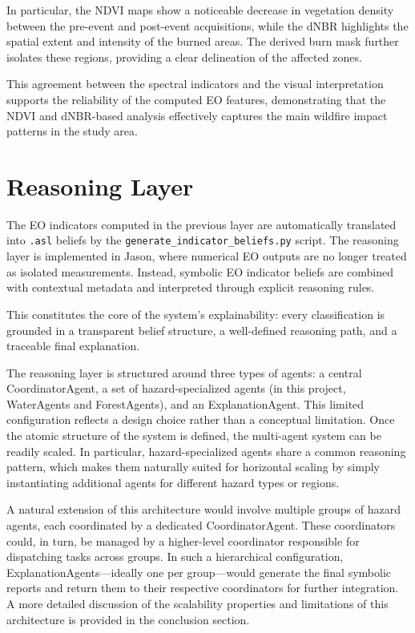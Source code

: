 \documentclass[12pt]{article}
\let\oldtexttt\texttt
\renewcommand{\texttt}[1]{{\fontsize{10.5}{12}\selectfont\oldtexttt{#1}}}
\begin{document}
In particular, the NDVI maps show a noticeable decrease in vegetation density between the pre-event and post-event acquisitions, while the dNBR highlights the spatial extent and intensity of the burned areas. The derived burn mask further isolates these regions, providing a clear delineation of the affected zones.

This agreement between the spectral indicators and the visual interpretation supports the reliability of the computed EO features, demonstrating that the NDVI and dNBR-based analysis effectively captures the main wildfire impact patterns in the study area.
\section{Reasoning Layer}

The EO indicators computed in the previous layer are automatically translated into \texttt{.asl} beliefs by the \texttt{generate\_indicator\_beliefs.py} script. The reasoning layer is implemented in Jason, where numerical EO outputs are no longer treated as isolated measurements. Instead, symbolic EO indicator beliefs are combined with contextual metadata and interpreted through explicit reasoning rules.

This constitutes the core of the system’s explainability: every classification is grounded in a transparent belief structure, a well-defined reasoning path, and a traceable final explanation.

The reasoning layer is structured around three types of agents: a central CoordinatorAgent, a set of hazard-specialized agents (in this project, WaterAgents and ForestAgents), and an ExplanationAgent. 
This limited configuration reflects a design choice rather than a conceptual limitation. Once the atomic structure of the system is defined, the multi-agent system can be readily scaled. In particular, hazard-specialized agents share a common reasoning pattern, which makes them naturally suited for horizontal scaling by simply instantiating additional agents for different hazard types or regions.

A natural extension of this architecture would involve multiple groups of hazard agents, each coordinated by a dedicated CoordinatorAgent. These coordinators could, in turn, be managed by a higher-level coordinator responsible for dispatching tasks across groups. In such a hierarchical configuration, ExplanationAgents—ideally one per group—would generate the final symbolic reports and return them to their respective coordinators for further integration. A more detailed discussion of the scalability properties and limitations of this architecture is provided in the conclusion section.
\end{document}
